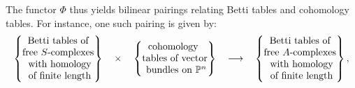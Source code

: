 \documentclass[12pt]{amsart}
\theoremstyle{definition}
\theoremstyle{remark}
\newcommand{\PP}{\mathbb{P}}
\newcommand{\cE}{\mathcal{E}}
\newcommand{\FF}{\mathbf{F}}
\begin{document}
The functor $\Phi$ thus yields bilinear pairings relating Betti tables and cohomology tables.  For instance, one such pairing is given by:
\begin{equation*}%
\label{eqn:**}
\begin{tabular}{c c c c c}
$\left\{\begin{matrix}
\text{Betti tables of} \\ \text{free $S$-complexes}\\
\text{ with homology}\\ \text{ of finite length}
\end{matrix}\right\}$
&
$\times$
&
$\left\{\begin{matrix}
\text{cohomology }\\
\text{tables of vector}\\
\text{ bundles on } \PP^n
\end{matrix}\right\}$
&
$\longrightarrow$
&
$\left\{\begin{matrix}
\text{Betti tables of} \\ \text{free $A$-complexes}\\
\text{ with homology}\\ \text{ of finite length}
\end{matrix}\right\},$
\end{tabular}
\end{equation*}
\end{document}
